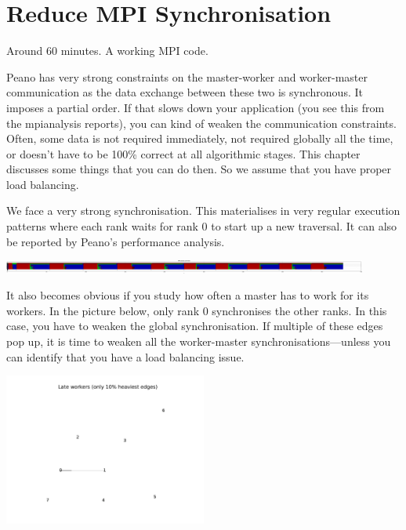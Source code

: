 \section{Reduce MPI Synchronisation}


\chapterDescription
  {
    Around 60 minutes.
  }
  {
    A working MPI code.
  }


Peano has very strong constraints on the master-worker and worker-master
communication as the data exchange between these two is synchronous. It imposes
a partial order. If that slows down your application (you see this from the
mpianalysis reports), you can kind of weaken the communication constraints. 
Often, some data is not required immediately, not required globally all the
time, or doesn't have to be 100\% correct at all algorithmic stages. This
chapter discusses some things that you can do then.
So we assume that you have proper load balancing.


\begin{smell}
We face a very strong synchronisation.
This materialises in very regular execution patterns
where each rank waits for rank 0 to start up a new traversal.
It can also be reported by Peano's performance analysis.
\end{smell}

\begin{center}
  \includegraphics[width=0.9\textwidth]{63_mpi-synchronisation/mpi-phases-before.pdf}
\end{center}

\noindent
It also becomes obvious if you study how often a master has to work for its 
workers. 
In the picture below, only rank 0 synchronises the other ranks.
In this case, you have to weaken the global synchronisation.
If multiple of these edges pop up, it is time to weaken all the worker-master
synchronisations---unless you can identify that you have a load balancing issue.


\begin{center}
  \includegraphics[width=0.5\textwidth]{63_mpi-synchronisation/master-worker-before.pdf}
\end{center}



